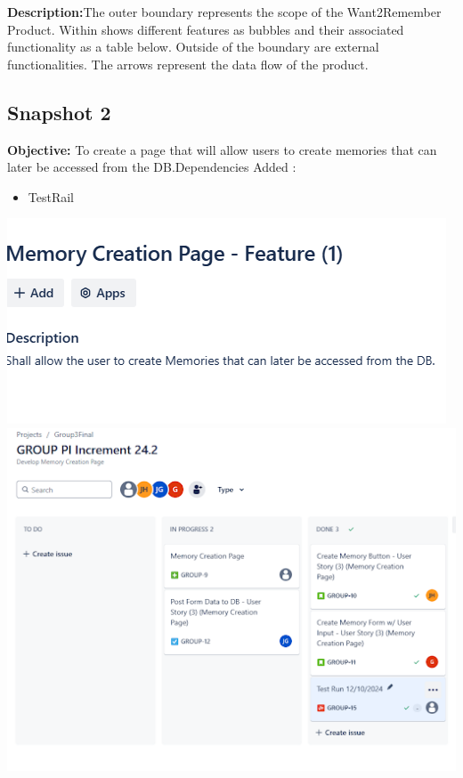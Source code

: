 \documentclass[12pt]{article}
\begin{document}
\textbf{Description:}The outer boundary represents the scope of the Want2Remember Product. Within shows different features as bubbles and their associated functionality as a table below. Outside of the boundary are external functionalities. The arrows represent the data flow of the product.


\subsection{Snapshot 2}
\textbf{Objective:} To create a page that will allow users to create memories that can later be accessed from the DB.\newline Dependencies Added :
\begin{itemize}
    \item
     TestRail
\end{itemize}
\includegraphics{snapshot2img1.png}
\includegraphics{snapshot2img2.png}
\end{document}
